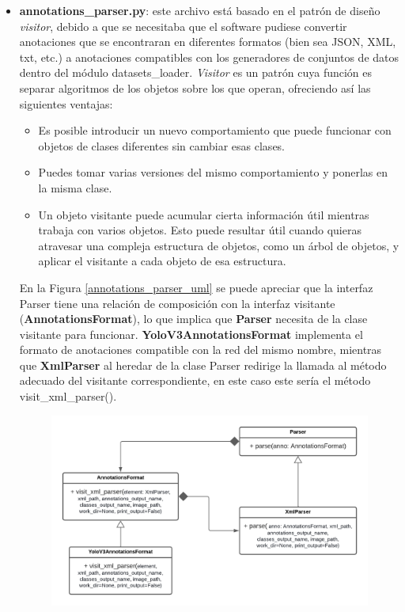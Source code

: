 \begin{itemize}
    \item \textbf{annotations\_parser.py}: este archivo está basado en el patrón de diseño \textit{visitor}, debido a que se necesitaba que el software pudiese convertir anotaciones que se encontraran en diferentes formatos (bien sea JSON, XML, txt, etc.) a anotaciones compatibles con los generadores de conjuntos de datos dentro del módulo datasets\_loader. \textit{Visitor} es un patrón cuya función es separar algoritmos de los objetos sobre los que operan, ofreciendo así las siguientes ventajas:
    \begin{itemize}
        \item Es posible introducir un nuevo comportamiento que puede funcionar con objetos de clases diferentes sin cambiar esas clases.
        \item Puedes tomar varias versiones del mismo comportamiento y ponerlas en la misma clase.
        \item Un objeto visitante puede acumular cierta información útil mientras trabaja con varios objetos. Esto puede resultar útil cuando quieras atravesar una compleja estructura de objetos, como un árbol de objetos, y aplicar el visitante a cada objeto de esa estructura.
    \end{itemize}
    En la Figura \ref{annotations_parser_uml} se puede apreciar que la interfaz Parser tiene una relación de composición con la interfaz visitante (\textbf{AnnotationsFormat}), lo que implica que \textbf{Parser} necesita de la clase visitante para funcionar. \textbf{YoloV3AnnotationsFormat} implementa el formato de anotaciones compatible con la red del mismo nombre, mientras que \textbf{XmlParser} al heredar de la clase Parser redirige la llamada al método adecuado del visitante correspondiente, en este caso este sería el método visit\_xml\_parser(). 
    \begin{figure}[H]
        \centering
        \includegraphics[scale=0.5]{Recursos/annotations_parser_uml.png}

\end{figure}
\end{itemize}
